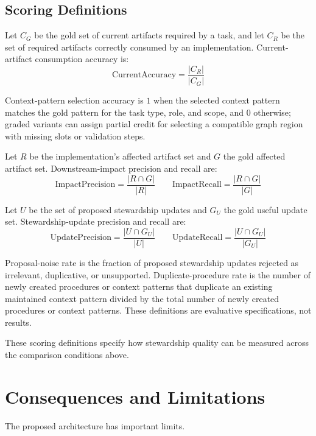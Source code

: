 \documentclass{article}
\begin{document}
\subsection{Scoring Definitions}

Let $C_G$ be the gold set of current artifacts required by a task, and let $C_R$ be the set of required artifacts correctly consumed by an implementation. Current-artifact consumption accuracy is:
\begin{equation}
\mathrm{CurrentAccuracy} = \frac{|C_R|}{|C_G|}
\end{equation}

Context-pattern selection accuracy is $1$ when the selected context pattern matches the gold pattern for the task type, role, and scope, and $0$ otherwise; graded variants can assign partial credit for selecting a compatible graph region with missing slots or validation steps.

Let $R$ be the implementation's affected artifact set and $G$ the gold affected artifact set. Downstream-impact precision and recall are:
\begin{equation}
\mathrm{ImpactPrecision} = \frac{|R \cap G|}{|R|}
\qquad
\mathrm{ImpactRecall} = \frac{|R \cap G|}{|G|}
\end{equation}

Let $U$ be the set of proposed stewardship updates and $G_U$ the gold useful update set. Stewardship-update precision and recall are:
\begin{equation}
\mathrm{UpdatePrecision} = \frac{|U \cap G_U|}{|U|}
\qquad
\mathrm{UpdateRecall} = \frac{|U \cap G_U|}{|G_U|}
\end{equation}

Proposal-noise rate is the fraction of proposed stewardship updates rejected as irrelevant, duplicative, or unsupported. Duplicate-procedure rate is the number of newly created procedures or context patterns that duplicate an existing maintained context pattern divided by the total number of newly created procedures or context patterns. These definitions are evaluative specifications, not results.

These scoring definitions specify how stewardship quality can be measured across the comparison conditions above.

\section{Consequences and Limitations}

The proposed architecture has important limits.
\end{document}
